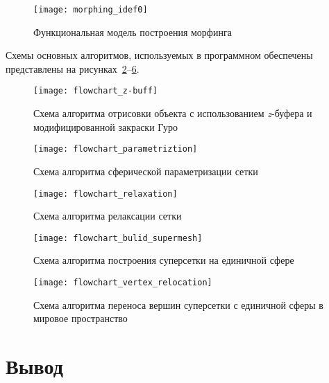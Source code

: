 \begin{figure}[H]
	\label{fig:morphig_idef0}
	\texttt{[image: morphing\_idef0]}
	\caption{Функциональная модель построения морфинга}
\end{figure}

Схемы основных алгоритмов, используемых в программном обеспечены представлены на рисунках~\ref{fig:flowсhart_z-buff}--\ref{fig:flowсhart_vertex_relocation}.

\begin{figure}[H]
	\label{fig:flowсhart_z-buff}
	\texttt{[image: flowchart\_z-buff]}
	\caption{Схема алгоритма отрисовки объекта с использованием \textit{z}-буфера и модифицированной закраски Гуро}
\end{figure}

\begin{figure}[H]
	\label{fig:flowсhart_parametrization}
	\texttt{[image: flowchart\_parametriztion]}
	\caption{Схема алгоритма сферической параметризации сетки}
\end{figure}

\begin{figure}[H]
	\label{fig:flowсhart_relaxation}
	\texttt{[image: flowchart\_relaxation]}
	\caption{Схема алгоритма релаксации сетки}
\end{figure}

\begin{figure}[H]
	\label{fig:flowсhart_build_supermesh}
	\texttt{[image: flowchart\_bulid\_supermesh]}
	\caption{Схема алгоритма построения суперсетки на единичной сфере}
\end{figure}

\begin{figure}[H]
	\label{fig:flowсhart_vertex_relocation}
	\texttt{[image: flowchart\_vertex\_relocation]}
	\caption{Схема алгоритма переноса вершин суперсетки с единичной сферы в мировое пространство}
\end{figure}



\section*{Вывод}

\clearpage